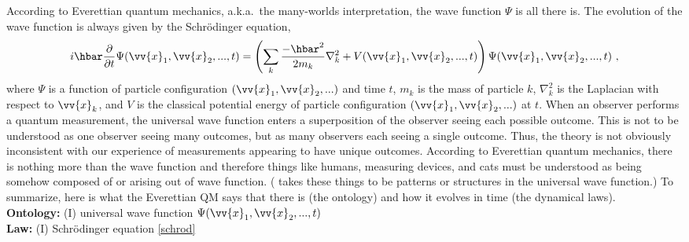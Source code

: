 \documentclass[onecolumn,secnumarabic,balancelastpage,amsmath,amssymb,nofootinbib]{article}
\begin{document}
According to Everettian quantum mechanics, a.k.a.\ the many-worlds interpretation, the wave function $\Psi$ is all there is.  The evolution of the wave function is always given by the Schr\"{o}dinger equation,
\begin{equation}
i\hbar\frac{\partial}{\partial t}\Psi(\vv{x}_1,\vv{x}_2,...,t)
=\left(\sum_k{\frac{-\hbar^2}{2 m_k}\nabla_k^2}+V(\vv{x}_1,\vv{x}_2,...,t)\right)\Psi(\vv{x}_1,\vv{x}_2,...,t)\ ,
\label{schrod}
\end{equation}
where $\Psi$ is a function of particle configuration $(\vv{x}_1,\vv{x}_2,...)$ and time $t$, $m_k$ is the mass of particle $k$, $\nabla_k^2$ is the Laplacian with respect to $\vv{x}_k$, and $V$ is the classical potential energy of particle configuration $(\vv{x}_1,\vv{x}_2,...)$ at $t$.  When an observer performs a quantum measurement, the universal wave function enters a superposition of the observer seeing each possible outcome.  This is not to be understood as one observer seeing many outcomes, but as many observers each seeing a single outcome. Thus, the theory is not obviously inconsistent with our experience of measurements appearing to have unique outcomes.  According to Everettian quantum mechanics, there is nothing more than the wave function and therefore things like humans, measuring devices, and cats must be understood as being somehow composed of or arising out of wave function.  (\citealp{wallace2003, wallace2012} takes these things to be patterns or structures in the universal wave function.)  To summarize, here is what the Everettian QM says that there is (the ontology) and how it evolves in time (the dynamical laws).
\vspace*{6 pt}\\\hspace*{1.2cm}\textbf{Ontology:} (I) universal wave function $\Psi(\vv{x}_1,\vv{x}_2,...,t)$
\\\hspace*{1.2cm}\textbf{Law:} (I) Schr\"{o}dinger equation \eqref{schrod}
\vspace*{6 pt}
\end{document}
